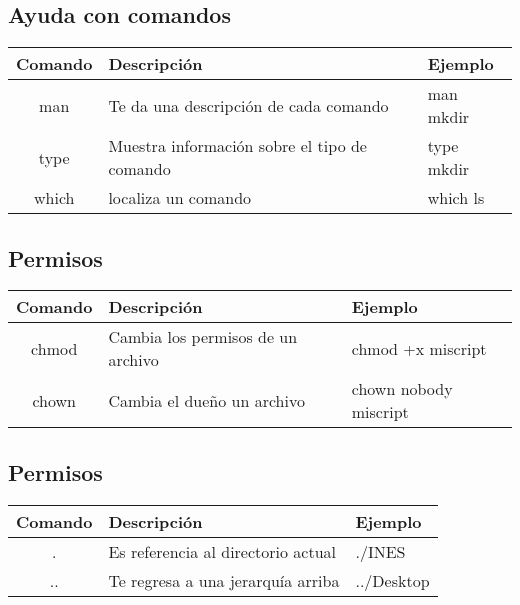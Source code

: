 \documentclass[12pt]{article}
\begin{document}
\subsection{Ayuda con comandos}
\begin{tabular}{|c|l|l|}
\hline
Comando & Descripción & Ejemplo \\ \hline
man & Te da una descripción de cada comando & man mkdir \\ \hline
type & Muestra información sobre el tipo de comando & type mkdir \\ \hline
which & localiza un comando & which ls \\ \hline
\end{tabular}
\subsection{Permisos}
\begin{tabular}{|c|l|l|}
\hline
Comando & Descripción & Ejemplo \\ \hline
chmod & Cambia los permisos de un archivo & chmod +x miscript \\ \hline
chown & Cambia el dueño un archivo & chown nobody miscript\\ \hline
\end{tabular}
\subsection{Permisos}
\begin{tabular}{|c|l|l|}
\hline
Comando & Descripción & Ejemplo \\ \hline
.  & Es referencia al directorio actual & ./INES \\ \hline
.. & Te regresa a una jerarquía arriba & ../Desktop \\ \hline
\end{tabular}
\end{document}
